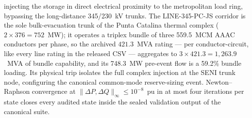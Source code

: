 injecting the storage in direct electrical proximity to the metropolitan load ring, bypassing the long-distance 345/230~kV trunks. The LINE-345-PC-JS corridor is the sole bulk-evacuation trunk of the Punta Catalina thermal complex ($2 \times 376 = 752$~MW); it operates a triplex bundle of three 559.5~MCM AAAC conductors per phase, so the archived $421.3$~MVA rating --- per conductor-circuit, like every line rating in the released CSV --- aggregates to $3 \times 421.3 = 1{,}263.9$~MVA of bundle capability, and its 748.3~MW pre-event flow is a 59.2\% bundle loading. Its physical trip isolates the full complex injection at the SENI trunk node, configuring the canonical common-mode reserve-sizing event. Newton--Raphson convergence at $\|\Delta P, \Delta Q\|_{\infty} \le 10^{-8}$~pu in at most four iterations per state closes every audited state inside the sealed validation output of the canonical suite.

